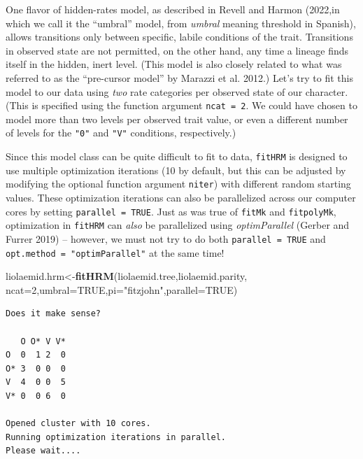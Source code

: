 \documentclass[fleqn,10pt,lineno]{wlpeerj} %
\newenvironment{Shaded}{\begin{snugshade}}{\end{snugshade}}
\newcommand{\AttributeTok}[1]{\textcolor[rgb]{0.13,0.29,0.53}{#1}}
\newcommand{\ConstantTok}[1]{\textcolor[rgb]{0.56,0.35,0.01}{#1}}
\newcommand{\DecValTok}[1]{\textcolor[rgb]{0.00,0.00,0.81}{#1}}
\newcommand{\FunctionTok}[1]{\textcolor[rgb]{0.13,0.29,0.53}{\textbf{#1}}}
\newcommand{\NormalTok}[1]{#1}
\newcommand{\OtherTok}[1]{\textcolor[rgb]{0.56,0.35,0.01}{#1}}
\newcommand{\StringTok}[1]{\textcolor[rgb]{0.31,0.60,0.02}{#1}}
\begin{document}
One flavor of hidden-rates model, as described in Revell and Harmon (2022,in which we call it the ``umbral'' model, from \emph{umbral} meaning threshold in Spanish), allows transitions only between specific, labile conditions of the trait. Transitions in observed state are not permitted, on the other hand, any time a lineage finds itself in the hidden, inert level. (This model is also closely related to what was referred to as the ``pre-cursor model'' by Marazzi et al. 2012.) Let's try to fit this model to our data using \emph{two} rate categories per observed state of our character. (This is specified using the function argument \texttt{ncat\ =\ 2}. We could have chosen to model more than two levels per observed trait value, or even a different number of levels for the \texttt{"0"} and \texttt{"V"} conditions, respectively.)

Since this model class can be quite difficult to fit to data, \texttt{fitHRM} is designed to use multiple optimization iterations (10 by default, but this can be adjusted by modifying the optional function argument \texttt{niter}) with different random starting values. These optimization iterations can also be parallelized across our computer cores by setting \texttt{parallel\ =\ TRUE}. Just as was true of \texttt{fitMk} and \texttt{fitpolyMk}, optimization in \texttt{fitHRM} can \emph{also} be parallelized using \emph{optimParallel} (Gerber and Furrer 2019) -- however, we must not try to do both \texttt{parallel\ =\ TRUE} and \texttt{opt.method\ =\ "optimParallel"} at the same time!

\begin{Shaded}
\begin{Highlighting}[]
\NormalTok{liolaemid.hrm}\OtherTok{\textless{}{-}}\FunctionTok{fitHRM}\NormalTok{(liolaemid.tree,liolaemid.parity,}
  \AttributeTok{ncat=}\DecValTok{2}\NormalTok{,}\AttributeTok{umbral=}\ConstantTok{TRUE}\NormalTok{,}\AttributeTok{pi=}\StringTok{"fitzjohn"}\NormalTok{,}\AttributeTok{parallel=}\ConstantTok{TRUE}\NormalTok{)}
\end{Highlighting}
\end{Shaded}

\begin{verbatim}
Does it make sense?

   O O* V V*
O  0  1 2  0
O* 3  0 0  0
V  4  0 0  5
V* 0  0 6  0

Opened cluster with 10 cores.
Running optimization iterations in parallel.
Please wait....
\end{verbatim}
\end{document}
